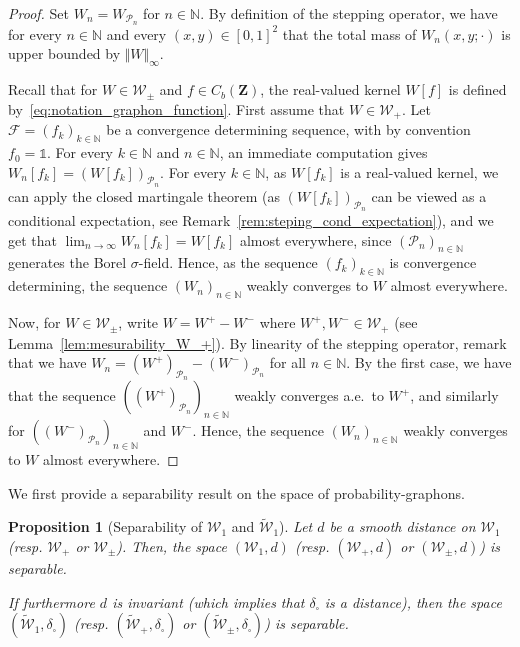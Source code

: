 \documentclass{amsart}
\newcommand{\aE}{a.e.\ }
\theoremstyle{plain}
\newtheorem{prop}[Th]{Proposition}
\theoremstyle{definition}
\newcommand{\Space}{\mathbf{Z}}
\newcommand{\signed}{\pm}
\newcommand{\cP}{\mathcal{P}}
\newcommand{\CbFunct}{C_b(\Space)}
\newcommand{\Graphon}{\mathcal{W}_1}
\newcommand{\Kernel}{\mathcal{W}_{\signed}}
\newcommand{\Kernelp}{\mathcal{W}_{+}}
\newcommand{\UGraphon}{\widetilde{\mathcal{W}}_1}
\newcommand{\UKernel}{\widetilde{\mathcal{W}}_{\signed}}
\newcommand{\UKernelp}{\widetilde{\mathcal{W}}_{+}}
\newcommand{\TM}[1]{\norm{#1}_\infty}
\newcommand{\dd}{\delta_{\square}}
\newcommand{\F}{\mathcal{F}}
\newcommand{\un}{\mathds{1}}
\newcommand{\N}{\mathbb{N}}
\newcommand{\norm}[1]{\Vert#1\Vert}
\begin{document}
\begin{proof}
Set $W_n= W_{\mathcal{P}_n}$ for $n\in \N$. 
  By definition of the stepping operator,
we have for every $n\in\N$ and every $(x,y)\in[0,1]^2$ 
that the total mass of $W_n(x,y; \cdot)$ is upper bounded by $\TM{W}$.

Recall  that for  $W\in\Kernel$ and  $f\in\CbFunct$, 
the real-valued kernel $W[f]$ is defined by~\eqref{eq:notation_graphon_function}.
First assume that $W\in\Kernelp$.
Let $\F = (f_k )_{k\in\N}$ be a convergence determining sequence, with by
convention  $f_0=\un$.  For  every $k\in\N$  and $n\in\N$,  an immediate
computation                                                        gives
$W_n[f_k]   = (W[f_k])_{\mathcal{P}_n}$. 
For every  $k\in\N$, as
$W[f_k]$  is   a  real-valued  kernel,  we   can  apply  
the closed martingale theorem 
	(as $(W[f_k])_{\mathcal{P}_n}$ can be viewed as a conditional expectation,
		see Remark~\ref{rem:steping_cond_expectation}),
and we get that
$\lim_{n\rightarrow \infty } W_n[f_k] 
=  W[f_k]$ 
almost everywhere, since $(\cP_n)_{n\in\N}$ generates the Borel $\sigma$-field. 
Hence, as the sequence $(f_k)_{k\in\N}$ is convergence determining,
the sequence  $(W_n)_{n\in\N}$
weakly converges to $W$ almost everywhere.

Now, for $W\in\Kernel$, write $W=W^+ - W^-$ where $W^+, W^- \in\Kernelp$
	(see Lemma~\ref{lem:mesurability_W_+}).
By linearity of the stepping operator, 
remark that we have $W_n = (W^+)_{\cP_n} - (W^-)_{\cP_n}$ for all $n\in \N$.
By the first case, we have that the sequence $((W^+)_{\cP_n})_{n\in\N}$ 
	weakly converges \aE to $W^+$,
and similarly for $((W^-)_{\cP_n})_{n\in\N}$ and $W^-$.
Hence, the sequence $(W_n)_{n\in\N}$
weakly converges to $W$ almost everywhere.
\end{proof}


We first provide a separability result on the space of probability-graphons. 

\begin{prop}[Separability of $\Graphon$ and $\UGraphon$]
  \label{theo_separable}
  Let $d$  be a smooth distance  on $\Graphon$ (resp. $\Kernelp$  or $\Kernel$).
  Then, the  space $(\Graphon,  d)$
  (resp.  $(\Kernelp, d)$  or $(\Kernel, d)$) is separable.
  
  If furthermore $d$ is invariant (which implies that $\dd$ is a distance), 
   then the  space $(\UGraphon,  \dd)$ (resp.  $(\UKernelp, \dd)$  or $(\UKernel, \dd)$) is separable.
\end{prop}
\end{document}
